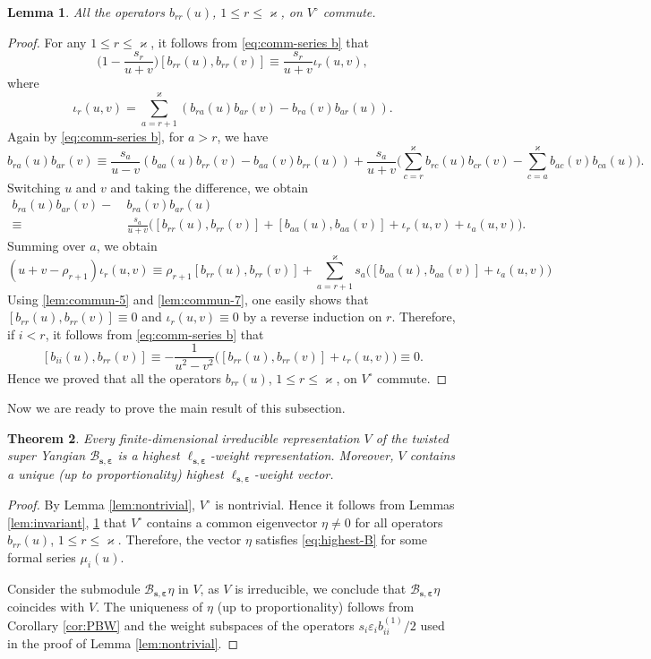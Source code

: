 \documentclass[11pt,reqno]{amsart}
\numberwithin{equation}{section}
\newtheorem{thm}{Theorem}[section]
\newtheorem{lem}[thm]{Lemma}
\theoremstyle{definition}
\theoremstyle{remark}
\newcommand{\beq}{\begin{equation}}
\newcommand{\eeq}{\end{equation}}
\newcommand{\lle}{\leqslant}
\newcommand{\BMN}{{\mathscr{B}_{\bm s,\bm \ve}}}
\newcommand{\ka}{\varkappa}
\newcommand{\ve}{\varepsilon}
\newcommand{\s}{{\bm s}}
\begin{document}
\begin{lem}\label{lem:commute}
All the operators $b_{rr}(u)$, $1\lle r\lle \ka$, on $V^\circ$ commute.
\end{lem}
\begin{proof}
For any $1\lle r\lle \ka$, it follows from \eqref{eq:comm-series b} that
\beq\label{lem:commun-5}
\Big(1-\frac{s_r}{u+v}\Big)[b_{rr}(u),b_{rr}(v)]\equiv \frac{s_r}{u+v}\iota_r(u,v),
\eeq
where
\beq\label{lem:commun-6}
\iota_r(u,v)=\sum_{a=r+1}^\ka(b_{ra}(u)b_{ar}(v)-b_{ra}(v)b_{ar}(u)).
\eeq
Again by \eqref{eq:comm-series b}, for $a > r$, we have
\[
b_{ra}(u)b_{ar}(v)\equiv \frac{s_a}{u-v}(b_{aa}(u)b_{rr}(v)-b_{aa}(v)b_{rr}(u))+\frac{s_a}{u+v}\Big(\sum_{c=r}^\ka b_{rc}(u)b_{cr}(v)-\sum_{c=a}^\ka b_{ac}(v)b_{ca}(u)\Big).
\]
Switching $u$ and $v$ and taking the difference, we obtain
\begin{align*}
 b_{ra}(u)b_{ar}(v)- &\  b_{ra}(v)b_{ar}(u ) \\ \equiv & \
 \frac{s_a}{u+v}\Big([b_{rr}(u),b_{rr}(v)]+[b_{aa}(u),b_{aa}(v)]+\iota_{r}(u,v)+\iota_a(u,v)\Big).
\end{align*}
Summing over $a$, we obtain
\beq\label{lem:commun-7}
(u+v-\rho_{r+1})\iota_{r}(u,v) \equiv \rho_{r+1}[b_{rr}(u),b_{rr}(v)]+\sum_{a=r+1}^\ka s_a\Big([b_{aa}(u),b_{aa}(v)]+\iota_a(u,v)\Big)
\eeq
Using \eqref{lem:commun-5} and \eqref{lem:commun-7}, one easily shows that $[b_{rr}(u),b_{rr}(v)]\equiv 0$ and $\iota_r(u,v)\equiv 0$ by a reverse induction on $r$. Therefore, if $i<r$, it follows from \eqref{eq:comm-series b} that
\[
[b_{ii}(u),b_{rr}(v)]\equiv -\frac{1}{u^2-v^2}\Big([b_{rr}(u),b_{rr}(v)]+\iota_r(u,v)\Big)\equiv 0.
\]
Hence we proved that all the operators $b_{rr}(u)$, $1\lle r\lle \ka$, on $V^\circ$ commute.
\end{proof}
Now we are ready to prove the main result of this subsection.
\begin{thm}
Every finite-dimensional irreducible representation $V$ of the twisted super Yangian $\BMN$ is a highest $\ell_{\s,\bm\ve}$-weight representation. Moreover, $V$ contains a unique (up to proportionality) highest $\ell_{\s,\bm\ve}$-weight vector.
\end{thm}
\begin{proof}
By Lemma \ref{lem:nontrivial}, $V^\circ$ is nontrivial. Hence it follows from Lemmas \ref{lem:invariant}, \ref{lem:commute} that $V^\circ$ contains a common eigenvector $\eta\ne 0$ for all operators $b_{rr}(u)$, $1\lle r\lle \ka$. Therefore, the vector $\eta$ satisfies \eqref{eq:highest-B} for some formal series $\mu_i(u)$.

Consider the submodule $\BMN\eta$ in $V$, as $V$ is irreducible, we conclude that $\BMN\eta$ coincides with $V$. The uniqueness of $\eta$ (up to proportionality) follows from Corollary \ref{cor:PBW} and the weight subspaces of the operators $s_i\ve_ib_{ii}^{(1)}/2$ used in the proof of Lemma \ref{lem:nontrivial}.
\end{proof}
\end{document}
